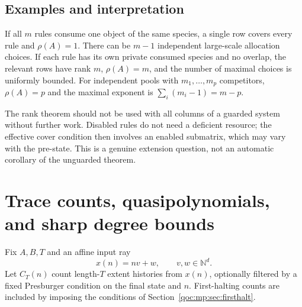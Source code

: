 \documentclass[11pt,letterpaper]{article}
\theoremstyle{definition}
\theoremstyle{remark}
\newcommand{\N}{\mathbb N}
\begin{document}
\subsection{Examples and interpretation}
If all $m$ rules consume one object of the same species, a single row
covers every rule and $\rho(A)=1$. There can be $m-1$ independent
large-scale allocation choices. If each rule has its own private
consumed species and no overlap, the relevant rows have rank $m$,
$\rho(A)=m$, and the number of maximal choices is uniformly bounded.
For independent pools with $m_1,\ldots,m_p$ competitors, $\rho(A)=p$ and
the maximal exponent is $\sum_i(m_i-1)=m-p$.

The rank theorem should not be used with all columns of a guarded system
without further work. Disabled rules do not need a deficient resource;
the effective cover condition then involves an enabled submatrix, which
may vary with the pre-state. This is a genuine extension question, not
an automatic corollary of the unguarded theorem.

\section{Trace counts, quasipolynomials, and sharp degree bounds}\label{qoc:mp:sec:quasi}
Fix $A,B,T$ and an affine input ray
\[
 x(n)=nv+w,\qquad v,w\in\N^d.
\]
Let $C_T(n)$ count length-$T$ extent histories from $x(n)$, optionally
filtered by a fixed Presburger condition on the final state and $n$.
First-halting counts are included by imposing the conditions of
Section~\ref{qoc:mp:sec:firsthalt}.
\end{document}
